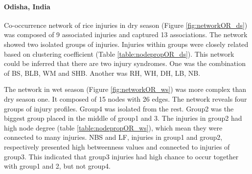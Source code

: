 \paragraph{Odisha, India}

Co-occurrence network of rice injuries in dry season (Figure \ref{fig:networkOR_ds}) was composed of 9 associated injuries and captured 13 associations. The network showed two isolated groups of injuries. Injuries within groups were closely related based on clustering coefficient (Table \ref{table:nodepropOR_ds}). This network could be inferred that there are two injury syndromes. One was the combination of BS, BLB, WM and SHB. Another was RH, WH, DH, LB, NB.

The network in wet season (Figure \ref{fig:networkOR_ws}) was more complex than dry season one. It composed of 15 nodes with 26 edges. The network reveals four groups of injury profiles. Group4 was isolated from the rest. Group2 was the biggest group placed in the middle of group1 and 3. The injuries in group2 had high node degree (table \ref{table:nodepropOR_ws}), which mean they were connected to many injuries. NBS and LF, injuries in group1 and group2, respectively presented high betweenness values and connected to injuries of group3. This indicated that group3 injuries had high chance to occur together with group1 and 2, but not group4. 

